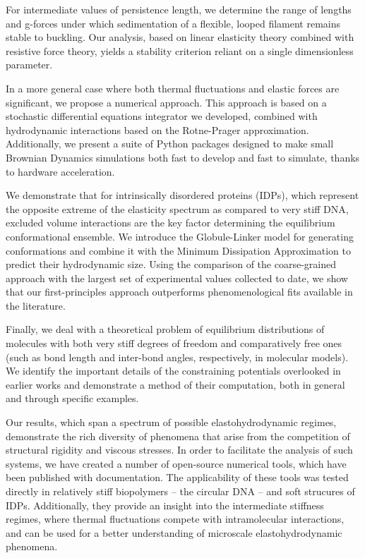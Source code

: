\documentclass{doctoral}
\begin{document}
For intermediate values of persistence length, we determine the range of lengths and g-forces under which sedimentation of a flexible, looped filament remains stable to buckling.
Our analysis, based on linear elasticity theory combined with resistive force theory, yields a stability criterion reliant on a single dimensionless parameter.

In a more general case where both thermal fluctuations and elastic forces are significant, we propose a numerical approach.
This approach is based on a stochastic differential equations integrator we developed, combined with hydrodynamic interactions based on the Rotne-Prager approximation.
Additionally, we present a suite of Python packages designed to make small Brownian Dynamics simulations both fast to develop and fast to simulate, thanks to hardware acceleration.

We demonstrate that for intrinsically disordered proteins (IDPs), which represent the opposite extreme of the elasticity spectrum as compared to very stiff DNA, excluded volume interactions are the key factor determining the equilibrium conformational ensemble.
We introduce the Globule-Linker model for generating conformations and combine it with the Minimum Dissipation Approximation to predict their hydrodynamic size.
Using the comparison of the coarse-grained approach with the largest set of experimental values collected to date, we show that our first-principles approach outperforms phenomenological fits available in the literature.

Finally, we deal with a theoretical problem of equilibrium distributions of molecules with both very stiff degrees of freedom and comparatively free ones (such as bond length and inter-bond angles, respectively, in molecular models).
We identify the important details of the constraining potentials overlooked in earlier works and demonstrate a method of their computation, both in general and through specific examples.

Our results, which span a spectrum of possible elastohydrodynamic regimes, demonstrate the rich diversity of phenomena that arise from the competition of structural rigidity and viscous stresses.
In order to facilitate the analysis of such systems, we have created a number of open-source numerical tools, which have been published with documentation.
The applicability of these tools was tested directly in relatively stiff biopolymers -- the circular DNA -- and soft strucures of IDPs.
Additionally, they provide an insight into the intermediate stiffness regimes, where thermal fluctuations compete with intramolecular interactions, and can be used for a better understanding of microscale elastohydrodynamic phenomena.
\clearpage
\end{document}
